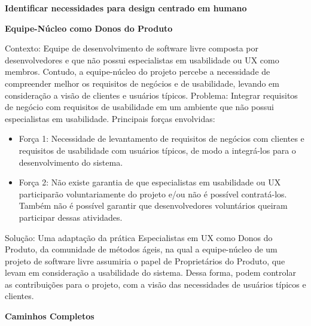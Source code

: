 \textbf{Identificar necessidades para design centrado em humano}

\textbf{Equipe-Núcleo como Donos do Produto}

Contexto: Equipe de desenvolvimento de software livre composta por desenvolvedores e que não possui especialistas em usabilidade ou UX como membros. Contudo, a equipe-núcleo do projeto percebe a necessidade de compreender melhor os requisitos de negócios e de usabilidade, levando em consideração a visão de clientes e usuários típicos.
Problema: Integrar requisitos de negócio com requisitos de usabilidade em um ambiente que não possui especialistas em usabilidade. Principais forças envolvidas:
\begin{itemize}
\item Força 1: Necessidade de levantamento de requisitos de negócios com clientes e requisitos de usabilidade com usuários típicos, de modo a integrá-los para o desenvolvimento do sistema.
\item Força 2: Não existe garantia de que especialistas em usabilidade ou UX participarão voluntariamente do projeto e/ou não é possível contratá-los. Também não é possível garantir que desenvolvedores voluntários queiram participar dessas atividades.
\end{itemize}
Solução: Uma adaptação da prática Especialistas em UX como Donos do Produto, da comunidade de métodos ágeis, na qual a equipe-núcleo de um projeto de software livre assumiria o papel de Proprietários do Produto, que levam em consideração a usabilidade do sistema. Dessa forma, podem controlar as contribuições para o projeto, com a visão das necessidades de usuários típicos e clientes.

%
\textbf{Caminhos Completos}

